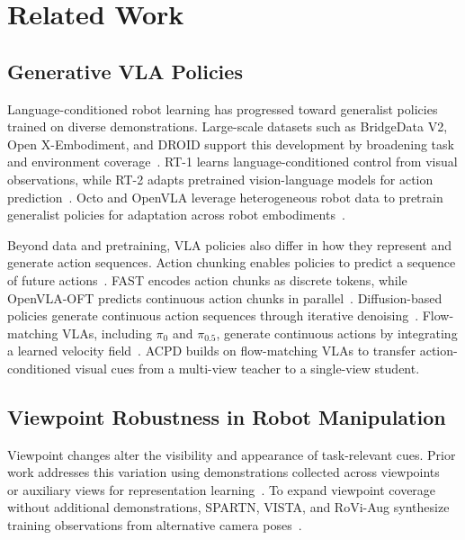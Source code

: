 \section{Related Work}

\subsection{Generative VLA Policies}

Language-conditioned robot learning has progressed toward generalist policies trained on diverse demonstrations. Large-scale datasets such as BridgeData V2, Open X-Embodiment, and DROID support this development by broadening task and environment coverage~\cite{walke2023bridgev2,oneill2024oxe,khazatsky2024droid}. RT-1 learns language-conditioned control from visual observations, while RT-2 adapts pretrained vision-language models for action prediction~\cite{brohan2023rt1,zitkovich2023rt2}. Octo and OpenVLA leverage heterogeneous robot data to pretrain generalist policies for adaptation across robot embodiments~\cite{ghosh2024octo,kim2025openvla}.

Beyond data and pretraining, VLA policies also differ in how they represent and generate action sequences. Action chunking enables policies to predict a sequence of future actions~\cite{zhao2023act}. FAST encodes action chunks as discrete tokens, while OpenVLA-OFT predicts continuous action chunks in parallel~\cite{pertsch2025fast,kim2025openvlaoft}. Diffusion-based policies generate continuous action sequences through iterative denoising~\cite{chi2025diffusionpolicy,ze2024dp3,liu2025rdt,wen2025diffusionvla}. Flow-matching VLAs, including $\pi_0$ and $\pi_{0.5}$, generate continuous actions by integrating a learned velocity field~\cite{black2025pi0,black2025pi05}. ACPD builds on flow-matching VLAs to transfer action-conditioned visual cues from a multi-view teacher to a single-view student.


\subsection{Viewpoint Robustness in Robot Manipulation}

Viewpoint changes alter the visibility and appearance of task-relevant cues. Prior work addresses this variation using demonstrations collected across viewpoints~\cite{ablett2021multiview} or auxiliary views for representation learning~\cite{seo2023multiview}. To expand viewpoint coverage without additional demonstrations, SPARTN, VISTA, and RoVi-Aug synthesize training observations from alternative camera poses~\cite{zhou2023spartn,tian2025vista,chen2025roviaug}.

